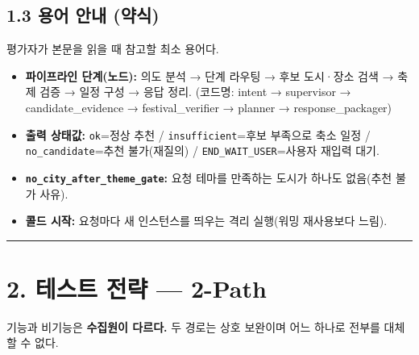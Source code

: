 \documentclass[11pt,a4paper]{article}
\newcommand{\DocNeedspace}[1]{\par\ifdim\dimexpr\pagegoal-\pagetotal\relax<#1\newpage\fi}
\providecommand{\tightlist}{\setlength{\itemsep}{0pt}\setlength{\parskip}{0pt}}
\begin{document}
\DocNeedspace{6\baselineskip}
\subsection*{1.3 용어 안내 (약식)}

평가자가 본문을 읽을 때 참고할 최소 용어다.

\begin{itemize}
\tightlist
\item
  \textbf{파이프라인 단계(노드):} 의도 분석 → 단계 라우팅 → 후보 도시·장소 검색 → 축제 검증 → 일정 구성 → 응답 정리. (코드명: intent → supervisor → candidate\_evidence → festival\_verifier → planner → response\_packager)
\item
  \textbf{출력 상태값:} \texttt{ok}=정상 추천 / \texttt{insufficient}=후보 부족으로 축소 일정 / \texttt{no\_\allowbreak{}candidate}=추천 불가(재질의) / \texttt{END\_\allowbreak{}WAIT\_\allowbreak{}USER}=사용자 재입력 대기.
\item
  \textbf{\texttt{no\_\allowbreak{}city\_\allowbreak{}after\_\allowbreak{}theme\_\allowbreak{}gate}:} 요청 테마를 만족하는 도시가 하나도 없음(추천 불가 사유).
\item
  \textbf{콜드 시작:} 요청마다 새 인스턴스를 띄우는 격리 실행(워밍 재사용보다 느림).
\end{itemize}

\begin{center}\rule{0.5\linewidth}{0.5pt}\end{center}

\newpage
\DocNeedspace{8\baselineskip}
\section*{2. 테스트 전략 --- 2-Path}

기능과 비기능은 \textbf{수집원이 다르다.} 두 경로는 상호 보완이며 어느 하나로 전부를 대체할 수 없다.
\end{document}
